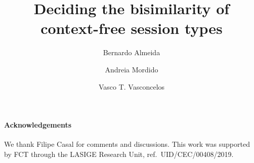 \documentclass[orivec,runningheads]{llncs}
\begin{document}
\title{Deciding the bisimilarity of context-free session types
}


\author{Bernardo Almeida \and
Andreia Mordido \and
Vasco T. Vasconcelos}

%
%



%
%
%


\maketitle











\paragraph{Acknowledgements}
\begin{sloppypar}
  We thank Filipe Casal for comments and discussions.
%
  This work was supported by FCT through the LASIGE Research Unit,
  ref.\ UID/CEC/00408/2019.
\end{sloppypar}



\newpage 
\appendix

%
%
%
%
\end{document}
